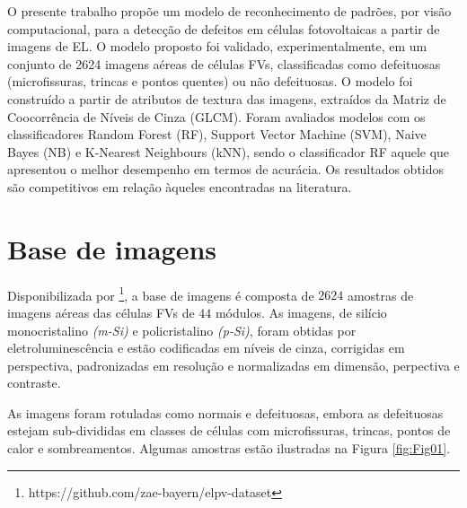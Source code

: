 \documentclass[a4paper]{ifacconf}
\begin{document}
O presente trabalho propõe um modelo de reconhecimento de padrões, por visão computacional, para a detecção de defeitos em células fotovoltaicas a partir de imagens de EL. O modelo proposto foi validado, experimentalmente, em um conjunto de 2624 imagens aéreas de células FVs, classificadas como defeituosas (microfissuras, trincas e pontos quentes) ou não defeituosas. O modelo foi construído a partir de atributos de textura das imagens, extraídos da Matriz de Coocorrência de Níveis de Cinza (GLCM). Foram avaliados modelos com os classificadores Random Forest (RF), Support Vector Machine (SVM), Naive Bayes (NB) e K-Nearest Neighbours (kNN), sendo o classificador RF aquele que apresentou o melhor desempenho em termos de acurácia. Os resultados obtidos são competitivos em relação àqueles encontradas na literatura.  



\section{Base de imagens}

Disponibilizada por \cite{Buerhop2018, Deitsch2018} \footnote{https://github.com/zae-bayern/elpv-dataset}, a base de imagens é composta de $2624$ amostras de imagens aéreas das células FVs de $44$ módulos. As imagens, de silício monocristalino \textit{(m-Si)} e policristalino \textit{(p-Si)}, foram obtidas por eletroluminescência e estão codificadas em níveis de cinza, corrigidas em perspectiva, padronizadas em resolução e normalizadas em dimensão, perpectiva e contraste.  

As imagens foram rotuladas como normais e defeituosas, embora as defeituosas estejam sub-divididas em classes de células com microfissuras, trincas, pontos de calor e sombreamentos. Algumas amostras estão ilustradas na Figura \ref{fig:Fig01}. 
\end{document}
